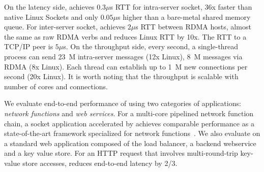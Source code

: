 On the latency side, \sys{} achieves $0.3\mu$s RTT for intra-server socket, 36x faster than native Linux Sockets and only $0.05\mu$s higher than a bare-metal shared memory queue. For inter-server socket, \sys{} achieves $2\mu$s RTT between RDMA hosts, almost the same as raw RDMA verbs and reduces Linux RTT by 10x. The RTT to a TCP/IP peer is $5\mu$s. On the throughput side, every second, a single-thread process can send 23~M intra-server messages (12x Linux), 8~M messages via RDMA (8x Linux).
Each thread can establish up to 1~M new connections per second (20x Linux). It is worth noting that the throughput is scalable with number of cores and connections.

We evaluate end-to-end performance of \sys{} using two categories of applications: \textit{network functions} and \textit{web services}. For a multi-core pipelined network function chain, a socket application accelerated by \sys{} achieves comparable performance as a state-of-the-art framework specialized for network functions~\cite{panda2016netbricks}. We also evaluate \sys{} on a standard web application composed of the load balancer, a backend webservice and a key value store. %
For an HTTP request that involves multi-round-trip key-value store accesses, \sys{} reduces end-to-end latency by 2/3. 
